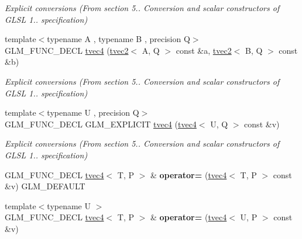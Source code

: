 \begin{DoxyCompactItemize}
\begin{DoxyCompactList}\small\item\em Explicit conversions (From section 5.. Conversion and scalar constructors of G\-L\-S\-L 1.. specification) \end{DoxyCompactList}\item 
\hypertarget{structglm_1_1tvec4_a366c3e1eaf05a24518eb47e0d87015dc}{{\footnotesize template$<$typename A , typename B , precision Q$>$ }\\G\-L\-M\-\_\-\-F\-U\-N\-C\-\_\-\-D\-E\-C\-L \hyperlink{structglm_1_1tvec4_a366c3e1eaf05a24518eb47e0d87015dc}{tvec4} (\hyperlink{structglm_1_1tvec2}{tvec2}$<$ A, Q $>$ const \&a, \hyperlink{structglm_1_1tvec2}{tvec2}$<$ B, Q $>$ const \&b)}\label{structglm_1_1tvec4_a366c3e1eaf05a24518eb47e0d87015dc}

\begin{DoxyCompactList}\small\item\em Explicit conversions (From section 5.. Conversion and scalar constructors of G\-L\-S\-L 1.. specification) \end{DoxyCompactList}\item 
\hypertarget{structglm_1_1tvec4_a14e75a80084280bf33a6d63d1802fac2}{{\footnotesize template$<$typename U , precision Q$>$ }\\G\-L\-M\-\_\-\-F\-U\-N\-C\-\_\-\-D\-E\-C\-L G\-L\-M\-\_\-\-E\-X\-P\-L\-I\-C\-I\-T \hyperlink{structglm_1_1tvec4_a14e75a80084280bf33a6d63d1802fac2}{tvec4} (\hyperlink{structglm_1_1tvec4}{tvec4}$<$ U, Q $>$ const \&v)}\label{structglm_1_1tvec4_a14e75a80084280bf33a6d63d1802fac2}

\begin{DoxyCompactList}\small\item\em Explicit conversions (From section 5.. Conversion and scalar constructors of G\-L\-S\-L 1.. specification) \end{DoxyCompactList}\item 
\hypertarget{structglm_1_1tvec4_a10a83b6d536547d5797365ce4b38bb8e}{G\-L\-M\-\_\-\-F\-U\-N\-C\-\_\-\-D\-E\-C\-L \hyperlink{structglm_1_1tvec4}{tvec4}$<$ T, P $>$ \& {\bfseries operator=} (\hyperlink{structglm_1_1tvec4}{tvec4}$<$ T, P $>$ const \&v) G\-L\-M\-\_\-\-D\-E\-F\-A\-U\-L\-T}\label{structglm_1_1tvec4_a10a83b6d536547d5797365ce4b38bb8e}

\item 
\hypertarget{structglm_1_1tvec4_ac0decc5432f220ec3026a99866ee356d}{{\footnotesize template$<$typename U $>$ }\\G\-L\-M\-\_\-\-F\-U\-N\-C\-\_\-\-D\-E\-C\-L \hyperlink{structglm_1_1tvec4}{tvec4}$<$ T, P $>$ \& {\bfseries operator=} (\hyperlink{structglm_1_1tvec4}{tvec4}$<$ U, P $>$ const \&v)}\label{structglm_1_1tvec4_ac0decc5432f220ec3026a99866ee356d}


\end{DoxyCompactItemize}
